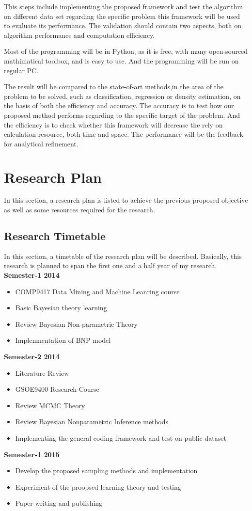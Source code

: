 \documentclass[a4paper,14pt]{article}
\begin{document}
\begin{enumerate}
	This steps include implementing the proposed framework and test the algorithm on different data set regarding the specific problem this framework will be used to evaluate its performance. The validation should contain two aspects, both on algorithm performance and computation efficiency.
	
	Most of the programming will be in Python, as it is free, with many open-sourced mathimatical toolbox, and is easy to use. And the programming will be run on regular PC. 
	
	
	The result will be compared to the state-of-art methods,in the area of the problem to be solved, such as classification, regression or density estimation, on the basis of both the efficiency and accuracy. The accuracy is to test how our proposed method performs regarding to the specific target of the problem. And the efficiency is to check whether this framework will decrease the rely on calculation resource, both time and space. The performance will be the feedback for analytical refinement.
\end{enumerate}
\section{Research Plan}
In this section, a research plan is listed to achieve the previous proposed objective as well as some resources required for the research.
\subsection{Research Timetable}
In this section, a timetable of the research plan will be described. Basically, this research is planned to span the first one and a half year of my research.
\vskip 1cm
\textbf{\large{Semester-1 2014}}
\begin{itemize}
	\item COMP9417 Data Mining and Machine Leanring course
	\item Basic Bayesian theory learning
	\item Review Bayesian Non-parametric Theory
	\item Implenmentation of BNP model
\end{itemize}
\vskip 1cm
\textbf{\large{Semester-2 2014}}
\begin{itemize}
	\item Literature Review
	\item GSOE9400 Research Course
	\item Review MCMC Theory
	\item Review Bayesian Nonparametric Inference methods
	\item Implementing the general coding framework and test on public dataset
\end{itemize}
\vskip 1cm
\textbf{\large{Semester-1 2015}}
\begin{itemize}
	\item Develop the proposed sampling methods and implementation
	\item Experiment of the proopsed learning theory and testing
	\item Paper writing and publishing
\end{itemize}
\end{document}
